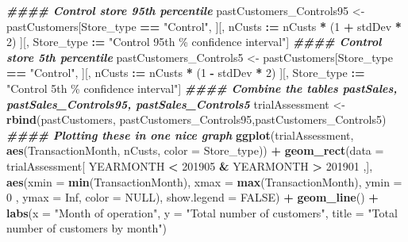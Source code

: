 \documentclass[
]{article}
\newenvironment{Shaded}{\begin{snugshade}}{\end{snugshade}}
\newcommand{\AttributeTok}[1]{\textcolor[rgb]{0.13,0.29,0.53}{#1}}
\newcommand{\ConstantTok}[1]{\textcolor[rgb]{0.56,0.35,0.01}{#1}}
\newcommand{\DecValTok}[1]{\textcolor[rgb]{0.00,0.00,0.81}{#1}}
\newcommand{\DocumentationTok}[1]{\textcolor[rgb]{0.56,0.35,0.01}{\textbf{\textit{#1}}}}
\newcommand{\FunctionTok}[1]{\textcolor[rgb]{0.13,0.29,0.53}{\textbf{#1}}}
\newcommand{\NormalTok}[1]{#1}
\newcommand{\OtherTok}[1]{\textcolor[rgb]{0.56,0.35,0.01}{#1}}
\newcommand{\SpecialCharTok}[1]{\textcolor[rgb]{0.81,0.36,0.00}{\textbf{#1}}}
\newcommand{\StringTok}[1]{\textcolor[rgb]{0.31,0.60,0.02}{#1}}
\begin{document}
\begin{Shaded}
\begin{Highlighting}[]
\DocumentationTok{\#\#\#\# Control store 95th percentile}
\NormalTok{pastCustomers\_Controls95 }\OtherTok{\textless{}{-}}\NormalTok{ pastCustomers[Store\_type }\SpecialCharTok{==} \StringTok{"Control"}\NormalTok{,}
\NormalTok{][, nCusts }\SpecialCharTok{:=}\NormalTok{ nCusts }\SpecialCharTok{*}\NormalTok{ (}\DecValTok{1} \SpecialCharTok{+}\NormalTok{ stdDev }\SpecialCharTok{*} \DecValTok{2}\NormalTok{)}
\NormalTok{][, Store\_type }\SpecialCharTok{:=} \StringTok{"Control 95th \% confidence interval"}\NormalTok{]}
\DocumentationTok{\#\#\#\# Control store 5th percentile}
\NormalTok{pastCustomers\_Controls5 }\OtherTok{\textless{}{-}}\NormalTok{ pastCustomers[Store\_type }\SpecialCharTok{==} \StringTok{"Control"}\NormalTok{,}
\NormalTok{][, nCusts }\SpecialCharTok{:=}\NormalTok{ nCusts }\SpecialCharTok{*}\NormalTok{ (}\DecValTok{1} \SpecialCharTok{{-}}\NormalTok{ stdDev }\SpecialCharTok{*} \DecValTok{2}\NormalTok{)}
\NormalTok{][, Store\_type }\SpecialCharTok{:=} \StringTok{"Control 5th \% confidence interval"}\NormalTok{]}
\DocumentationTok{\#\#\#\# Combine the tables pastSales, pastSales\_Controls95, pastSales\_Controls5}
\NormalTok{trialAssessment }\OtherTok{\textless{}{-}} \FunctionTok{rbind}\NormalTok{(pastCustomers, pastCustomers\_Controls95,pastCustomers\_Controls5)}
\DocumentationTok{\#\#\#\# Plotting these in one nice graph}
\FunctionTok{ggplot}\NormalTok{(trialAssessment, }\FunctionTok{aes}\NormalTok{(TransactionMonth, nCusts, }\AttributeTok{color =}\NormalTok{ Store\_type)) }\SpecialCharTok{+}
  \FunctionTok{geom\_rect}\NormalTok{(}\AttributeTok{data =}\NormalTok{ trialAssessment[ YEARMONTH }\SpecialCharTok{\textless{}} \DecValTok{201905} \SpecialCharTok{\&}\NormalTok{ YEARMONTH }\SpecialCharTok{\textgreater{}} \DecValTok{201901}\NormalTok{ ,],}
\FunctionTok{aes}\NormalTok{(}\AttributeTok{xmin =} \FunctionTok{min}\NormalTok{(TransactionMonth), }\AttributeTok{xmax =} \FunctionTok{max}\NormalTok{(TransactionMonth), }\AttributeTok{ymin =} \DecValTok{0}\NormalTok{ ,}
\AttributeTok{ymax =} \ConstantTok{Inf}\NormalTok{, }\AttributeTok{color =} \ConstantTok{NULL}\NormalTok{), }\AttributeTok{show.legend =} \ConstantTok{FALSE}\NormalTok{) }\SpecialCharTok{+} \FunctionTok{geom\_line}\NormalTok{() }\SpecialCharTok{+} 
\FunctionTok{labs}\NormalTok{(}\AttributeTok{x =} \StringTok{"Month of operation"}\NormalTok{, }\AttributeTok{y =} \StringTok{"Total number of customers"}\NormalTok{, }\AttributeTok{title =} \StringTok{"Total number of customers by month"}\NormalTok{)}
\end{Highlighting}
\end{Shaded}
\end{document}
